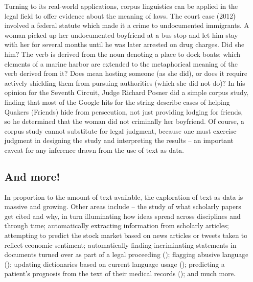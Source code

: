 Turning to its real-world applications, corpus linguistics can be applied in the legal field to offer
evidence about the meaning of laws.  The  court case (2012) involved a federal statute which made
it a crime to  undocumented immigrants.  A woman picked
up her undocumented boyfriend at a bus stop and let him stay with her
for several months until he was later arrested on drug charges.  Did
she  him?  The verb  is derived from the
noun denoting a place to dock boats; which elements of a marine harbor
are extended to the metaphorical meaning of the verb derived from it?
Does  mean hosting someone (as she did), or does it
require actively shielding them from pursuing authorities (which she
did not do)?  In his opinion for the Seventh Circuit, Judge Richard
Posner did a simple corpus study, finding that most of the Google hits
for the string  describe cases of helping
Quakers (Friends) hide from persecution, not just providing lodging
for friends, so he determined that the woman did not criminally
 her boyfriend.  Of course, a corpus study cannot
substitute for legal judgment, because one must exercise judgment in
designing the study and interpreting the results -- an important
caveat for any inference drawn from the use of text as data.

\subsection{And more!}

In proportion to the amount of text available, the exploration of text
as data is massive and growing. Other areas include 
 -- the study of what scholarly papers get
cited and why, in turn illuminating how ideas spread across
disciplines and through time; automatically extracting information
from scholarly articles; attempting to predict  the stock market based on news
articles or tweets taken to reflect economic sentiment; automatically
finding incriminating statements in documents turned over as part of a
legal proceeding (); flagging abusive
language (); updating dictionaries based
on current language usage (); predicting a patient's prognosis from the text of their
medical records (); and much more.





